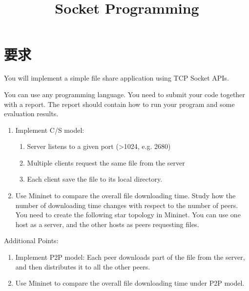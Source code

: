 

\title{Socket Programming}
\maketitle
\section{要求}
You will implement a simple file share application using TCP Socket APIs. 

You can use any programming language. You need to submit your code together with a report. The report should contain how to run your program and some evaluation results.

\begin{enumerate}
    \item Implement C/S model: 
    \begin{enumerate}
        \item Server listens to a given port (>1024, e.g. 2680)
        \item Multiple clients request the same file from the server
        \item Each client save the file to its local directory.
    \end{enumerate}
    \item Use Mininet to compare the overall file downloading time. Study how the number of downloading time changes with respect to the number of peers. You need to create the following star topology in Mininet. You can use one host as a server, and the other hosts as peers requesting files.
\end{enumerate}

Additional Points:

\begin{enumerate}
    \item Implement P2P model: Each peer downloads part of the file from the server, and then distributes it to all the other peers.

    \item Use Mininet to compare the overall file downloading time under P2P model.
\end{enumerate}

